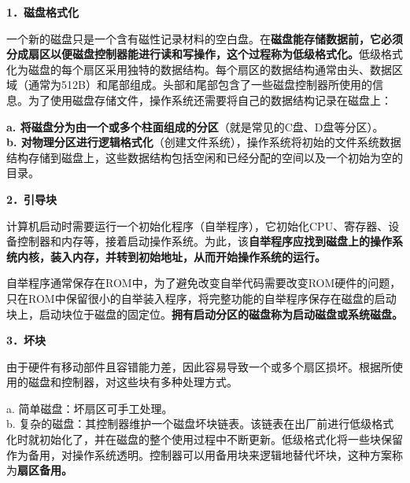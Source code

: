 \textbf{{1．磁盘格式化}}

{一个新的磁盘只是一个含有磁性记录材料的空白盘。在}\textbf{磁盘能存储数据前，它必须分成扇区以便磁盘控制器能进行读和写操作，这个过程称为低级格式化。}{低级格式化为磁盘的每个扇区采用独特的数据结构。每个扇区的数据结构通常由头、数据区域（通常为512B）和尾部组成。头部和尾部包含了一些磁盘控制器所使用的信息。}{为了使用磁盘存储文件，操作系统还需要将自己的数据结构记录在磁盘上：}

\textbf{a.
将磁盘分为由一个或多个柱面组成的分区}（就是常见的C盘、D盘等分区）。\\

\textbf{b.
对物理分区进行逻辑格式化}（创建文件系统），操作系统将初始的文件系统数据结构存储到磁盘上，这些数据结构包括空闲和已经分配的空间以及一个初始为空的目录。

\textbf{{2．引导块}}

计算机启动时需要运行一个初始化程序（自举程序），它初始化CPU、寄存器、设备控制器和内存等，接着启动操作系统。为此，该\textbf{自举程序应找到磁盘上的操作系统内核，装入内存，并转到初始地址，从而开始操作系统的运行。}

自举程序通常保存在ROM中，为了避免改变自举代码需要改变ROM硬件的问题，只在ROM中保留很小的自举装入程序，将完整功能的自举程序保存在磁盘的启动块上，启动块位于磁盘的固定位。\textbf{拥有启动分区的磁盘称为启动磁盘或系统磁盘。}

\textbf{{3．坏块}}

{由于硬件有移动部件且容错能力差，因此容易导致一个或多个扇区损坏。根据所使用的磁盘和控制器，对这些块有多种处理方式。}

a. 简单磁盘：坏扇区可手工处理。\\
b.
复杂的磁盘：其控制器维护一个磁盘坏块链表。该链表在出厂前进行低级格式化时就初始化了，并在磁盘的整个使用过程中不断更新。低级格式化将一些块保留作为备用，对操作系统透明。控制器可以用备用块来逻辑地替代坏块，这种方案称为\textbf{{扇区备用}。}
